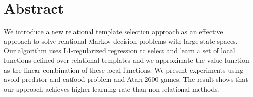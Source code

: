 
\chapter{Abstract}

We introduce a new relational template selection approach as 
an effective approach to solve relational Markov decision problems
with large state spaces. Our algorithm uses L1-regularized regression
to select and learn a set of local functions defined over relational templates
and we approximate the value function as the linear combination of these local
functions. We present experiments using avoid-predator-and-eatfood problem and Atari 2600 games.
The result shows that our approach achieves higher learning rate than non-relational methods.

\vfill
\begin{center}
\begin{sf}
\end{sf}
\end{center}
